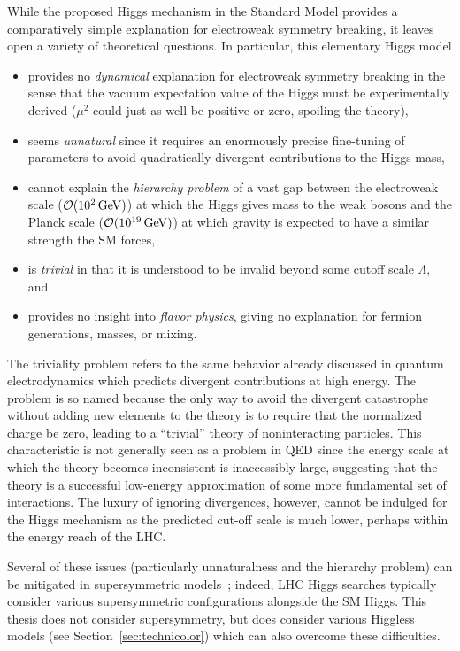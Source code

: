 While the proposed Higgs mechanism in the Standard Model provides a comparatively simple explanation for electroweak symmetry breaking, it leaves open a variety of theoretical questions.  In particular, this elementary Higgs model \cite{Lane:2000pa,Shrock:2007km}
\begin{itemize}
\item provides no \emph{dynamical} explanation for electroweak symmetry breaking in the sense that the vacuum expectation value of the Higgs must be experimentally derived ($\mu^2$ could just as well be positive or zero, spoiling the theory),
\item seems \emph{unnatural} since it requires an enormously precise fine-tuning of parameters to avoid quadratically divergent contributions to the Higgs mass,
\item cannot explain the \emph{hierarchy problem} of a vast gap between the electroweak scale ($\mathcal{O}(\sienergy{e2})$) at which the Higgs gives mass to the weak bosons and the Planck scale ($\mathcal{O}(\sienergy{e19})$) at which gravity is expected to have a similar strength the SM forces,
\item is \emph{trivial} in that it is understood to be invalid beyond some cutoff scale $\Lambda$, and
\item provides no insight into \emph{flavor physics}, giving no explanation for fermion generations, masses, or mixing.
\end{itemize}

The triviality problem refers to the same behavior already discussed in quantum electrodynamics which predicts divergent contributions at high energy.  The problem is so named because the only way to avoid the divergent catastrophe without adding new elements to the theory is to require that the normalized charge be zero, leading to a ``trivial'' theory of noninteracting particles.  This characteristic is not generally seen as a problem in QED since the energy scale at which the theory becomes inconsistent is inaccessibly large, suggesting that the theory is a successful low-energy approximation of some more fundamental set of interactions.  The luxury of ignoring divergences, however, cannot be indulged for the Higgs mechanism as the predicted cut-off scale is much lower, perhaps within the energy reach of the LHC.

Several of these issues (particularly unnaturalness and the hierarchy problem) can be mitigated in supersymmetric models~\cite{Lane:2000pa}; indeed, LHC Higgs searches typically consider various supersymmetric configurations alongside the SM Higgs.  This thesis does not consider supersymmetry, but does consider various Higgless models (see Section~\ref{sec:technicolor}) which can also overcome these difficulties.

